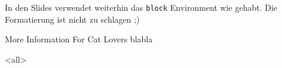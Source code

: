 \begin{frame}[fragile]
{In den Slides verwendet weiterhin das \texttt{block} Environment wie gehabt. Die Formatierung ist nicht zu schlagen ;)

\begin{b1note}{More Information For Cat Lovers}
 blabla
\end{b1note}

% 
}





\mode
<all>

\end{frame}
\newpage

